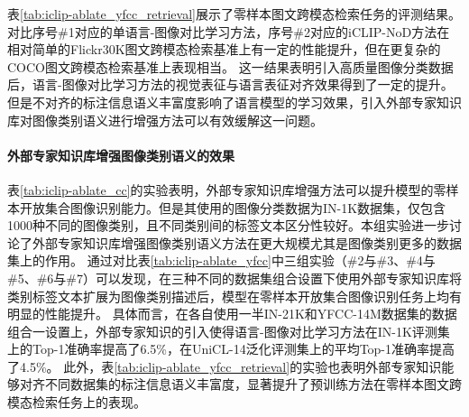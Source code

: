 表\ref{tab:iclip-ablate_yfcc_retrieval}展示了零样本图文跨模态检索任务的评测结果。对比序号\#1对应的单语言-图像对比学习方法，序号\#2对应的iCLIP-NoD方法在相对简单的Flickr30K图文跨模态检索基准上有一定的性能提升，但在更复杂的COCO图文跨模态检索基准上表现相当。
这一结果表明引入高质量图像分类数据后，语言-图像对比学习方法的视觉表征与语言表征对齐效果得到了一定的提升。但是不对齐的标注信息语义丰富度影响了语言模型的学习效果，引入外部专家知识库对图像类别语义进行增强方法可以有效缓解这一问题。

\paragraph{外部专家知识库增强图像类别语义的效果} 
表\ref{tab:iclip-ablate_cc}的实验表明，外部专家知识库增强方法可以提升模型的零样本开放集合图像识别能力。但是其使用的图像分类数据为IN-1K数据集，仅包含1000种不同的图像类别，且不同类别间的标签文本区分性较好。本组实验进一步讨论了外部专家知识库增强图像类别语义方法在更大规模尤其是图像类别更多的数据集上的作用。
通过对比表\ref{tab:iclip-ablate_yfcc}中三组实验（\#2与\#3、\#4与\#5、\#6与\#7）可以发现，在三种不同的数据集组合设置下使用外部专家知识库将类别标签文本扩展为图像类别描述后，模型在零样本开放集合图像识别任务上均有明显的性能提升。
具体而言，在各自使用一半IN-21K和YFCC-14M数据集的数据组合一设置上，外部专家知识的引入使得语言-图像对比学习方法在IN-1K评测集上的Top-1准确率提高了6.5\%，在UniCL-14泛化评测集上的平均Top-1准确率提高了4.5\%。
此外，表\ref{tab:iclip-ablate_yfcc_retrieval}的实验也表明外部专家知识能够对齐不同数据集的标注信息语义丰富度，显著提升了预训练方法在零样本图文跨模态检索任务上的表现。%

